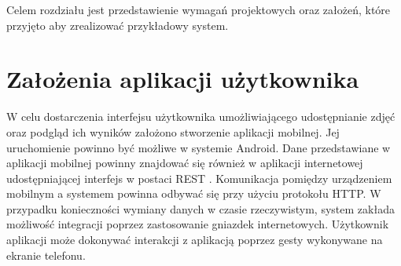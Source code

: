 Celem rozdziału jest przedstawienie wymagań projektowych oraz założeń, które przyjęto aby zrealizować przykładowy system. 

\section{Założenia aplikacji użytkownika}{
W celu dostarczenia interfejsu użytkownika umożliwiającego udostępnianie zdjęć oraz podgląd ich wyników założono stworzenie aplikacji mobilnej. Jej uruchomienie powinno być możliwe w systemie Android. Dane przedstawiane w aplikacji mobilnej powinny znajdować się również w aplikacji internetowej udostępniającej interfejs w postaci REST \cite{REST}. Komunikacja pomiędzy urządzeniem mobilnym a systemem powinna odbywać się przy użyciu protokołu HTTP. W przypadku konieczności wymiany danych w czasie rzeczywistym, system zakłada możliwość integracji poprzez zastosowanie gniazdek internetowych. Użytkownik aplikacji może dokonywać interakcji z aplikacją poprzez gesty wykonywane na ekranie telefonu. 
}

